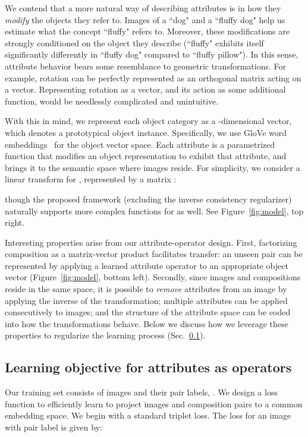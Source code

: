 \documentclass[runningheads]{llncs}
\begin{document}
We contend that a more natural way of describing attributes is in how they \emph{modify} the objects they refer to. Images of a ``dog" and a ``fluffy dog" help us estimate what the concept ``fluffy" refers to. Moreover, these modifications are strongly conditioned on the object they describe (``fluffy" exhibits itself significantly differently in ``fluffy dog" compared to ``fluffy pillow").
In this sense, attribute behavior bears some resemblance to geometric transformations.  For example, rotation can be perfectly represented as an orthogonal matrix acting on a vector. Representing rotation as a vector, and its action as some additional function, would be needlessly complicated and unintuitive. 

With this in mind, we represent each object category  as a -dimensional vector, which denotes a prototypical object instance. Specifically, we use GloVe word embeddings~\cite{pennington2014glove} for the object vector space.  Each attribute  is a parametrized function  that modifies an object representation to exhibit that attribute, and brings it to the semantic space where images reside. For simplicity, we consider a linear transform for , represented by a  matrix :

though the proposed framework (excluding the inverse consistency regularizer)  naturally supports more complex functions for  as well. See Figure~\ref{fig:model}, top right. 

Interesting properties arise from our attribute-operator design.
First, factorizing composition as a matrix-vector product facilitates transfer: an unseen pair can be represented by applying a learned attribute operator to an appropriate object vector (Figure~\ref{fig:model}, bottom left).
Secondly, since images and compositions reside in the same space, it is possible to \emph{remove} attributes from an image by applying the inverse of the transformation; multiple attributes can be applied consecutively to images; and the structure of the attribute space can be coded into how the transformations behave. Below we discuss how we leverage these properties to regularize the learning process (Sec.~\ref{sec:loss_function}).

\subsection{Learning objective for attributes as operators} \label{sec:loss_function}

Our training set consists of  images and their pair labels, .  
We design a loss function to efficiently learn to project images and composition pairs  to a common embedding space. We begin with a standard triplet loss. The loss for an image  with pair label  is given by:
\end{document}
